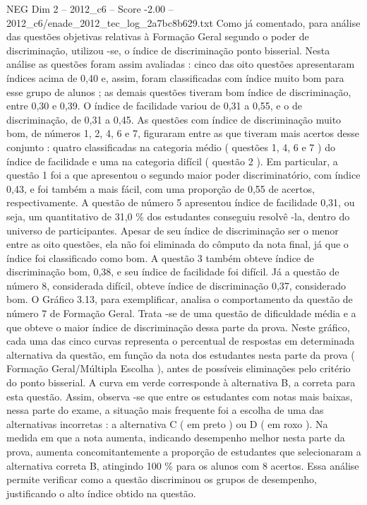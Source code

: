 \begin{textsample}{NEG Dim 2 – 2012\_c6 – Score -2.00 – 2012\_c6/enade\_2012\_tec\_log\_2a7bc8b629.txt}
Como já comentado, para análise das questões objetivas relativas à Formação Geral segundo o poder de discriminação, utilizou -se, o índice de discriminação ponto bisserial.
Nesta análise as questões foram assim avaliadas : cinco das oito questões apresentaram índices acima de 0,40 e, assim, foram classificadas com índice muito bom para esse grupo de alunos ; as demais questões tiveram bom índice de discriminação, entre 0,30 e 0,39.
O índice de facilidade variou de 0,31 a 0,55, e o de discriminação, de 0,31 a 0,45.
As questões com índice de discriminação muito bom, de números 1, 2, 4, 6 e 7, figuraram entre as que tiveram mais acertos desse conjunto : quatro classificadas na categoria médio ( questões 1, 4, 6 e 7 ) do índice de facilidade e uma na categoria difícil ( questão 2 ).
Em particular, a questão 1 foi a que apresentou o segundo maior poder discriminatório, com índice 0,43, e foi também a mais fácil, com uma proporção de 0,55 de acertos, respectivamente.
A questão de número 5 apresentou índice de facilidade 0,31, ou seja, um quantitativo de 31,0 \% dos estudantes conseguiu resolvê -la, dentro do universo de participantes.
Apesar de seu índice de discriminação ser o menor entre as oito questões, ela não foi eliminada do cômputo da nota final, já que o índice foi classificado como bom.
A questão 3 também obteve índice de discriminação bom, 0,38, e seu índice de facilidade foi difícil.
Já a questão de número 8, considerada difícil, obteve índice de discriminação 0,37, considerado bom.
O Gráfico 3.13, para exemplificar, analisa o comportamento da questão de número 7 de Formação Geral.
Trata -se de uma questão de dificuldade média e a que obteve o maior índice de discriminação dessa parte da prova.
Neste gráfico, cada uma das cinco curvas representa o percentual de respostas em determinada alternativa da questão, em função da nota dos estudantes nesta parte da prova ( Formação Geral/Múltipla Escolha ), antes de possíveis eliminações pelo critério do ponto bisserial.
A curva em verde corresponde à alternativa B, a correta para esta questão.
Assim, observa -se que entre os estudantes com notas mais baixas, nessa parte do exame, a situação mais frequente foi a escolha de uma das alternativas incorretas : a alternativa C ( em preto ) ou D ( em roxo ).
Na medida em que a nota aumenta, indicando desempenho melhor nesta parte da prova, aumenta concomitantemente a proporção de estudantes que selecionaram a alternativa correta B, atingindo 100 \% para os alunos com 8 acertos.
Essa análise permite verificar como a questão discriminou os grupos de desempenho, justificando o alto índice obtido na questão.

\end{textsample}
